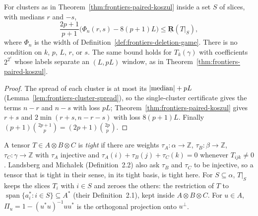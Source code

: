 \begin{corollary}
  \label{cor:frontiers-paired-phi}
  \leanok
  For clusters as in Theorem~\ref{thm:frontiers-paired-koszul} inside a set $S$ of slices,
  with medians $r$ and $-s$,
  \[
    \frac{2p + 1}{p + 1} \bigl(\Phi_n(r, s) - 8(p + 1)L\bigr)
      \le \underline{\mathbf{R}}(T|_S),
  \]
  where $\Phi_n$ is the width of Definition~\ref{def:frontiers-deletion-game}. There is no
  condition on $k$, $p$, $L$, $r$, or $s$. The same bound holds for $T_k(\gamma)$ with
  coefficients $2^{2^{e}}$ whose labels separate an $(L, pL)$ window, as in
  Theorem~\ref{thm:frontiers-paired-koszul}.
\end{corollary}
\begin{proof}
  \leanok
  The spread of each cluster is at most its $|{\rm median}| + pL$
  (Lemma~\ref{lem:frontiers-cluster-spread}), so the single-cluster certificate gives the
  terms $n - r$ and $n - s$ with loss $pL$; Theorem~\ref{thm:frontiers-paired-koszul} gives
  $r + s$ and $2 \min(r + s, n - r - s)$ with loss $8(p + 1)L$. Finally
  $(p + 1) \binom{2p+1}{p} = (2p + 1) \binom{2p}{p}$.
\end{proof}

\begin{definition}
  \label{def:frontiers-tight}
  \leanok
  A tensor $T \in A \otimes B \otimes C$ is \emph{tight} if there are weights
  $\tau_A \colon \alpha \to \mathbb{Z}$, $\tau_B \colon \beta \to \mathbb{Z}$,
  $\tau_C \colon \gamma \to \mathbb{Z}$ with $\tau_A$ injective and
  $\tau_A(i) + \tau_B(j) + \tau_C(k) = 0$ whenever $T_{ijk} \ne 0$. Landsberg and
  Micha{\l}ek (Definition~2.2) also ask $\tau_B$ and $\tau_C$ to be injective, so a
  tensor that is tight in their sense, in its tight basis, is tight here. For
  $S \subseteq \alpha$, $T|_S$ keeps the slices $T_i$ with $i \in S$ and zeroes the
  others: the restriction of $T$ to $\operatorname{span}\{a_i^* : i \in S\} \subseteq A^*$
  (their Definition~2.1), kept inside $A \otimes B \otimes C$. For $u \in A$,
  $\Pi_u = 1 - (u^* u)^{-1} u u^*$ is the orthogonal projection onto $u^\perp$.
\end{definition}

